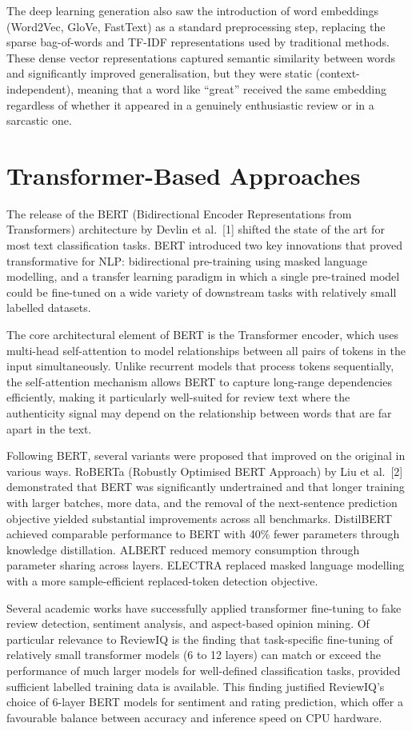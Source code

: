 \documentclass[12pt,a4paper,oneside]{report}
\begin{document}
The deep learning generation also saw the introduction of word
embeddings (Word2Vec, GloVe, FastText) as a standard preprocessing step,
replacing the sparse bag-of-words and TF-IDF representations used by
traditional methods. These dense vector representations captured semantic
similarity between words and significantly improved generalisation, but
they were static (context-independent), meaning that a word like ``great''
received the same embedding regardless of whether it appeared in a
genuinely enthusiastic review or in a sarcastic one.

\section{Transformer-Based Approaches}
The release of the BERT (Bidirectional Encoder Representations from
Transformers) architecture by Devlin et al.~[1] shifted the state of
the art for most text classification tasks. BERT introduced two key
innovations that proved transformative for NLP: bidirectional
pre-training using masked language modelling, and a transfer learning
paradigm in which a single pre-trained model could be fine-tuned on a
wide variety of downstream tasks with relatively small labelled datasets.

The core architectural element of BERT is the Transformer encoder, which
uses multi-head self-attention to model relationships between all pairs of
tokens in the input simultaneously. Unlike recurrent models that process
tokens sequentially, the self-attention mechanism allows BERT to capture
long-range dependencies efficiently, making it particularly well-suited
for review text where the authenticity signal may depend on the
relationship between words that are far apart in the text.

Following BERT, several variants were proposed that improved on the
original in various ways. RoBERTa (Robustly Optimised BERT Approach) by
Liu et al.~[2] demonstrated that BERT was significantly undertrained
and that longer training with larger batches, more data, and the removal
of the next-sentence prediction objective yielded substantial improvements
across all benchmarks. DistilBERT achieved comparable performance to BERT
with 40\% fewer parameters through knowledge distillation. ALBERT reduced
memory consumption through parameter sharing across layers. ELECTRA
replaced masked language modelling with a more sample-efficient
replaced-token detection objective.

Several academic works have successfully applied transformer fine-tuning
to fake review detection, sentiment analysis, and aspect-based opinion
mining. Of particular relevance to ReviewIQ is the finding that
task-specific fine-tuning of relatively small transformer models (6 to 12
layers) can match or exceed the performance of much larger models for
well-defined classification tasks, provided sufficient labelled training
data is available. This finding justified ReviewIQ's choice of 6-layer
BERT models for sentiment and rating prediction, which offer a favourable
balance between accuracy and inference speed on CPU hardware.
\end{document}
